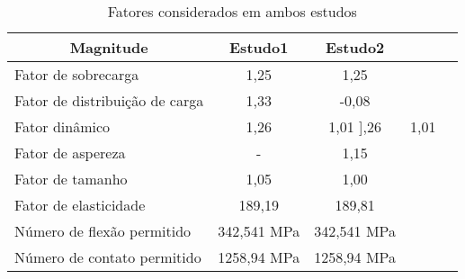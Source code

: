\begin{table}[]
\centering
\caption{\label{tab:9} Fatores considerados em ambos estudos}
\begin{tabular}{l c c c c}
\hline
\multicolumn{1}{c}{\textbf{Magnitude}} & \textbf{Estudo1} & \textbf{Estudo2} \\ \hline
Fator de sobrecarga                 & 1,25              & 1,25 \\
Fator de distribuição de carga      & 1,33              & -0,08 \\
Fator dinâmico                      & 1,26              & 1,01 
],26              & 1,01              \\
Fator de aspereza                      & -                 & 1,15              \\
Fator de tamanho                       & 1,05              & 1,00              \\
Fator de elasticidade                  & 189,19            & 189,81            \\
Número de flexão permitido             & 342,541 MPa       & 342,541 MPa       \\
Número de contato permitido            & 1258,94 MPa       & 1258,94 MPa   \\ \hline  
\end{tabular}
\end{table}
